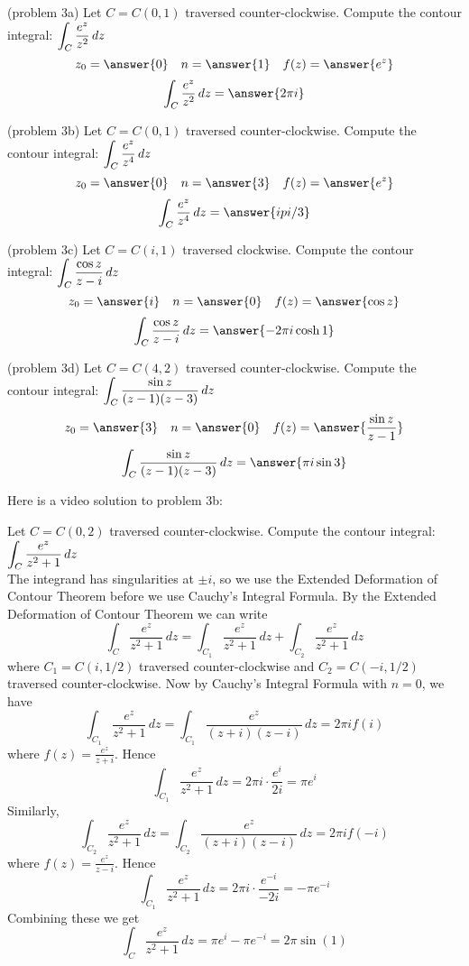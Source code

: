 \documentclass[handout]{ximera}
\begin{document}
\begin{problem}(problem 3a)
Let $C = C(0, 1)$ traversed counter-clockwise. Compute the contour integral: $\displaystyle \int_C \frac{e^z}{z^2} \, dz$\\
\[
z_0 = \answer{0} \quad n = \answer{1} \quad f(z) = \answer{e^z}
\]
\[
\int_C \frac{e^z}{z^2} \, dz = \answer{2\pi i}
\]
\end{problem}
\begin{problem}(problem 3b)
Let $C = C(0, 1)$ traversed counter-clockwise. Compute the contour integral: $\displaystyle \int_C \frac{e^z}{z^4} \, dz$\\
\[
z_0 = \answer{0} \quad n = \answer{3} \quad f(z) = \answer{e^z}
\]
\[
\int_C \frac{e^z}{z^4}\, dz = \answer{i pi /3}
\]
\end{problem}
\begin{problem}(problem 3c)
Let $C = C(i, 1)$ traversed clockwise. Compute the contour integral: $\displaystyle \int_C \frac{\cos z}{z-i} \, dz$\\
\[
z_0 = \answer{i} \quad n = \answer{0} \quad f(z) = \answer{\cos z}
\]
\[
\int_C \frac{\cos z}{z-i}\, dz = \answer{-2\pi i \cosh 1}
\]
\end{problem}
\begin{problem}(problem 3d)
Let $C = C(4, 2)$ traversed counter-clockwise. Compute the contour integral: $\displaystyle \int_C \frac{\sin z}{(z-1)(z-3)} \, dz$\\
\[
z_0 = \answer{3} \quad n = \answer{0} \quad f(z) = \answer{\frac{\sin z}{z-1}}
\]
\[
\int_C \frac{\sin z}{(z-1)(z-3)} \, dz = \answer{\pi i \sin 3}
\]
\end{problem}

Here is a video solution to problem 3b:\\
\begin{foldable}
\end{foldable}


\begin{example}[example 4]
Let $C = C(0, 2)$ traversed counter-clockwise. Compute the contour integral: $\displaystyle \int_C \frac{e^z}{z^2 +1} \, dz$\\
The integrand has singularities at $\pm i$, so we use the Extended Deformation of Contour Theorem before we use Cauchy's Integral Formula.
By the Extended Deformation of Contour Theorem we can write
\[
\int_C \frac{e^z}{z^2 +1} \, dz = \int_{C_1} \frac{e^z}{z^2 +1} \, dz +  \int_{C_2} \frac{e^z}{z^2 +1} \, dz 
\]
where $C_1 = C(i, 1/2)$ traversed counter-clockwise and $C_2 = C(-i, 1/2)$ traversed counter-clockwise.
Now by Cauchy's Integral Formula with $n = 0$, we have
\[
\int_{C_1} \frac{e^z}{z^2 +1} \, dz = \int_{C_1} \frac{e^z}{(z+i)(z-i)} \, dz = 2\pi i f(i)
\]
where $f(z) = \frac{e^z}{z+i}$.
Hence
\[
\int_{C_1} \frac{e^z}{z^2 +1} \, dz = 2\pi i \cdot \frac{e^i}{2i} = \pi e^i
\]
Similarly,
\[
\int_{C_2} \frac{e^z}{z^2 +1} \, dz = \int_{C_2} \frac{e^z}{(z+i)(z-i)} \, dz = 2\pi i f(-i)
\]
where $f(z) = \frac{e^z}{z-i}$.
Hence
\[
\int_{C_1} \frac{e^z}{z^2 +1} \, dz = 2\pi i \cdot \frac{e^{-i}}{-2i} = -\pi e^{-i}
\]
Combining these we get
\[
\int_C \frac{e^z}{z^2 +1} \, dz = \pi e^i - \pi e^{-i} = 2\pi \sin(1)
\]
\end{example}
\end{document}
